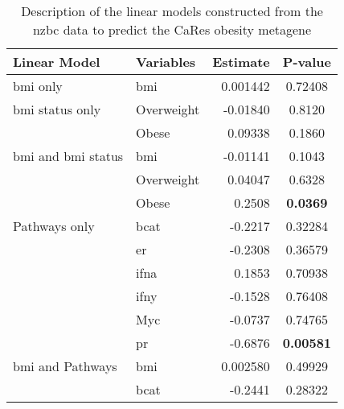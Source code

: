 	\begin{table}[htpb]
		\centering
		\caption{Description of the linear models constructed from the \gls{nzbc} data to predict the CaRes obesity metagene}
		\label{tab:lm_sig_var_cares}
		\begin{threeparttable}
			\begin{tabular}{llrc}
				Linear Model & Variables & Estimate & P-value\\
				\hline
				\hline
				\rule{0pt}{2.25ex}\gls{bmi} only                           & \gls{bmi}  & 0.001442  & 0.72408 \\
				\hline
				\rule{0pt}{2.25ex}\gls{bmi} status only                    & Overweight & -0.01840  & 0.8120  \\
                                                                           & Obese      & 0.09338   & 0.1860  \\
				\hline
				\rule{0pt}{2.25ex}\gls{bmi} and \gls{bmi} status           & \gls{bmi}  & -0.01141  & 0.1043  \\
                                                                           & Overweight & 0.04047   & 0.6328  \\
                                                                           & Obese      & 0.2508    & \bfseries 0.0369   \\
				\hline
				\rule{0pt}{2.25ex}Pathways only                            & \gls{bcat} & -0.2217   & 0.32284 \\
                                                                           & \gls{er}   & -0.2308   & 0.36579 \\
                                                                           & \gls{ifna} & 0.1853    & 0.70938 \\
                                                                           & \gls{ifny} & -0.1528   & 0.76408 \\
                                                                           & Myc        & -0.0737   & 0.74765 \\
                                                                           & \gls{pr}   & -0.6876   & \bfseries 0.00581  \\
				\hline
				\rule{0pt}{2.25ex}\gls{bmi} and Pathways                   & \gls{bmi}  & 0.002580  & 0.49929 \\
                                                                           & \gls{bcat} & -0.2441   & 0.28322 \\

\end{tabular}
\end{threeparttable}
\end{table}
